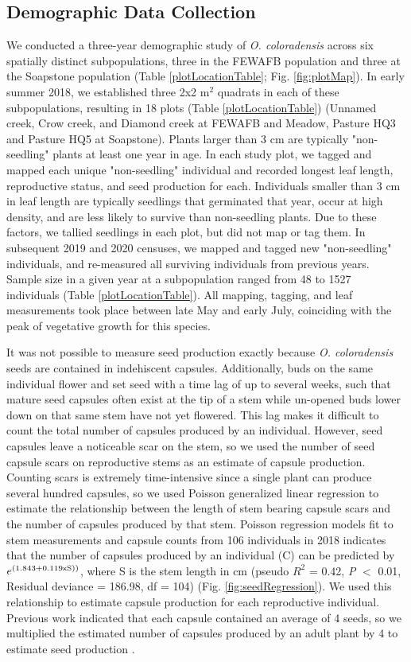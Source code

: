 \documentclass[12pt, letterpaper]{article}
\begin{document}
\subsection{Demographic Data Collection}
 We conducted a three-year demographic study of \textit{O. coloradensis} across six spatially distinct subpopulations, three in the FEWAFB population and three at the Soapstone population (Table \ref{plotLocationTable}; Fig. \ref{fig:plotMap}). In early summer 2018, we established three 2\textsf{x}2 m$^2$ quadrats in each of these subpopulations, resulting in 18 plots (Table \ref{plotLocationTable}) (Unnamed creek, Crow creek, and Diamond creek at FEWAFB and Meadow, Pasture HQ3 and Pasture HQ5 at Soapstone). Plants larger than 3 cm are typically "non-seedling" plants at least one year in age. In each study plot, we tagged and mapped each unique "non-seedling" individual and recorded longest leaf length, reproductive status, and seed production for each. Individuals smaller than 3 cm in leaf length are typically seedlings that germinated that year, occur at high density, and are less likely to survive than non-seedling plants. Due to these factors, we tallied seedlings in each plot, but did not map or tag them. In subsequent 2019 and 2020 censuses, we mapped and tagged new "non-seedling" individuals, and re-measured all surviving individuals from previous years. Sample size in a given year at a subpopulation ranged from 48 to 1527 individuals (Table \ref{plotLocationTable}). All mapping, tagging, and leaf measurements took place between late May and early July, coinciding with the peak of vegetative growth for this species. 

It was not possible to measure seed production exactly because \textit{O. coloradensis} seeds are contained in indehiscent capsules. Additionally, buds on the same individual flower and set seed with a time lag of up to several weeks, such that mature seed capsules often exist at the tip of a stem while un-opened buds lower down on that same stem have not yet flowered. This lag makes it difficult to count the total number of capsules produced by an individual. However, seed capsules leave a noticeable scar on the stem, so we used the number of seed capsule scars on reproductive stems as an estimate of capsule production. Counting scars is extremely time-intensive since a single plant can produce several hundred capsules, so we used Poisson generalized linear regression to estimate the relationship between the length of stem bearing capsule scars and the number of capsules produced by that stem. Poisson regression models fit to stem measurements and capsule counts from 106 individuals in 2018 indicates that the number of capsules produced by an individual (C) can be predicted by $e^{(1.843 + 0.119\text{\textsf{x}}\text{S}))}$, where S is the stem length in cm (pseudo $R^2$ = 0.42, \textit{P} $<$ 0.01, Residual deviance = 186.98, df = 104) (Fig. \ref{fig:seedRegression}). We used this relationship to estimate capsule production for each reproductive individual. Previous work indicated that each capsule contained an average of 4 seeds, so we multiplied the estimated number of capsules produced by an adult plant by 4 to estimate seed production \cite{Burgess2005CapsuleColoradensis}. 
\end{document}
